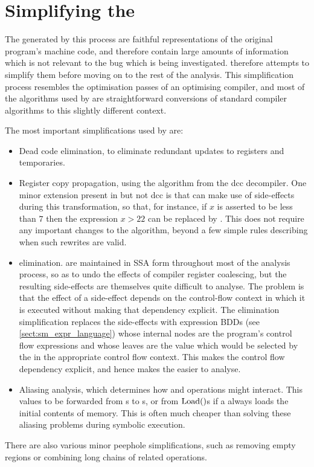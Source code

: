 \section{Simplifying the {\StateMachine}}
\label{sect:derive:simplify_sm}

The {\StateMachines} generated by this process are faithful
representations of the original program's machine code, and therefore
contain large amounts of information which is not relevant to the bug
which is being investigated.  {\Technique} therefore attempts to
simplify them before moving on to the rest of the analysis.  This
simplification process resembles the optimisation passes of an
optimising compiler, and most of the algorithms used by {\technique}
are straightforward conversions of standard compiler algorithms to
this slightly different context.

The most important simplifications used by {\technique} are:

\begin{itemize}
\item Dead code elimination, to eliminate redundant updates to
  registers and {\StateMachine} temporaries.
\item Register copy propagation, using the algorithm from the
  dcc\cite{Cifuentes1994} decompiler.  One minor extension present in
  {\implementation} but not dcc is that {\implementation} can make use
  of  side-effects during this transformation, so that,
  for instance, if $x$ is asserted to be less than $7$ then the
  expression $x > 22$ can be replaced by \false.  This does not
  require any important changes to the algorithm, beyond a few simple
  rules describing when such rewrites are valid.
\item \state{$\Phi$} elimination.  {\STateMachines} are maintained in
  SSA form throughout most of the analysis process, so as to undo the
  effects of compiler register coalescing, but the resulting
  \state{$\Phi$} side-effects are themselves quite difficult to
  analyse.  The problem is that the effect of a \state{$\Phi$}
  side-effect depends on the control-flow context in which it is
  executed without making that dependency explicit.  The
  \state{$\Phi$} elimination simplification replaces the
  \state{$\Phi$} side-effects with expression BDDs (see
  \autoref{sect:sm_expr_language}) whose internal nodes are the
  program's control flow expressions and whose leaves are the value
  which would be selected by the \state{$\Phi$} in the appropriate
  control flow context.  This makes the control flow dependency
  explicit, and hence makes the {\StateMachine} easier to analyse.
\item Aliasing analysis, which determines how  and
   operations might interact.  This values to be forwarded
  from s to s, or from $\mathrm{Load}()$s if a
   always loads the initial contents of memory.  This is
  often much cheaper than solving these aliasing problems during
  symbolic execution.
\end{itemize}
There are also various minor peephole simplifications, such as
removing empty  regions or combining long chains of
related  operations.

